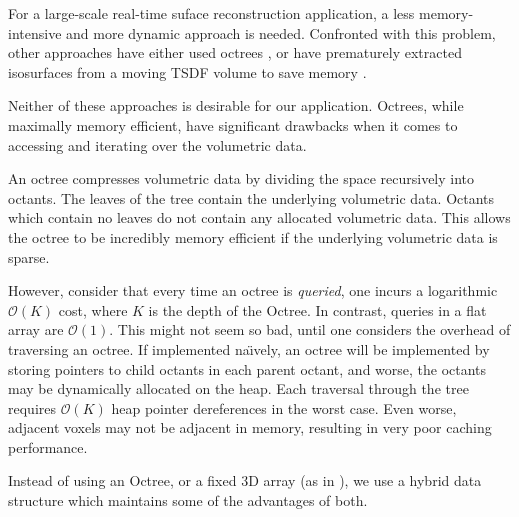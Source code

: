 \documentclass[10pt,twocolumn,letterpaper]{article}
\begin{document}
For a large-scale real-time suface reconstruction application, a less
memory-intensive and more dynamic approach is needed. Confronted with this
problem, other approaches have either used  octrees \cite{Wurm2010}, or have
prematurely extracted isosurfaces from a moving TSDF volume to save memory
\cite{Whelan2013}.

Neither of these approaches is desirable for our application. Octrees, while
maximally memory efficient, have significant drawbacks when it comes to
accessing and iterating over the volumetric data.

An octree compresses volumetric data by dividing the space recursively into
octants. The leaves of the tree contain the underlying volumetric data. Octants
which contain no leaves do not contain any allocated volumetric data. This
allows the octree to be incredibly memory efficient if the underlying
volumetric data is sparse.

However, consider that every time an octree is \emph{queried}, one incurs a
logarithmic $\mathcal{O}(K)$ cost, where $K$ is the depth of the Octree. In
contrast, queries in a flat array are $\mathcal{O}(1)$. This might not seem so
bad, until one considers the overhead of traversing an octree. If implemented na\"{\i}vely, an
octree will be implemented by storing pointers to child octants in each parent
octant, and worse, the octants may be dynamically allocated on the heap. Each
traversal through the tree requires $\mathcal{O}(K)$ heap pointer
dereferences in the worst case. Even worse, adjacent voxels may not be adjacent
in memory, resulting in very poor caching performance.

Instead of using an Octree, or a fixed 3D array (as in \cite{Newcombe,
Whelan2013}), we use a hybrid data structure which maintains some of the
advantages of both. 
\end{document}
